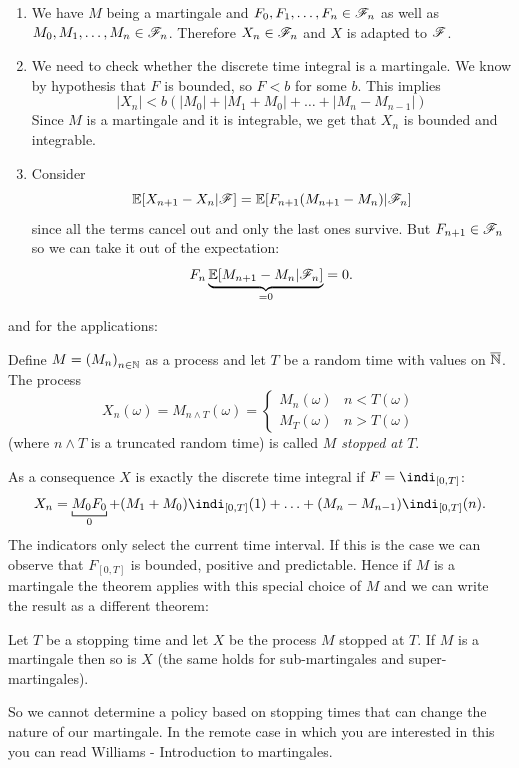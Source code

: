 \documentclass{report}
\begin{document}
\begin{fancyproof}
	\begin{enumerate}
		\item	We have $M$ being a martingale and $F_0,F_1,\ldots,F_n\in\mathscr{F}_{n}$ as well as $M_0,M_1,\ldots,M_{n}\in\mathscr{F}_n$. Therefore $X_{n}\in\mathscr{F}_{n}$ and $X$ is adapted to $\mathscr{F}$.
		\item We need to check whether the discrete time integral is a martingale. We know by hypothesis that $F$ is bounded, so $F<b$ for some $b$. This implies
		\begin{equation*}
			|X_{n}|<b(|M_{0}|+|M_1+M_0|+\ldots+|M_n-M_{n-1}|)
		\end{equation*}
		Since $M$ is a martingale and it is integrable, we get that $X_n$ is bounded and integrable.
		\item Consider
		\begin{equation*}
			\mathbb{E}[X_{n+1}-X_{n}|\mathscr{F}]=\mathbb{E}[F_{n+1}(M_{n+1}-M_{n})|\mathscr{F}_n]
		\end{equation*}
		since all the terms cancel out and only the last ones survive. But $F_{n+1}\in\mathscr{F}_{n}$ so we can take it out of the expectation:
		\[F_{n}\underbrace{\mathbb{E}[M_{n+1}-M_{n}|\mathscr{F}_{n}]}_{=0}=0.\]
	\end{enumerate}
\end{fancyproof}
and for the applications:\\
\begin{definition}
	Define $M={(M_{n})}_{n\in\mathbb{N}}$ as a process and let $T$ be a random time with values on $\overline{\mathbb{N}}$. The process
	\[X_{n}(\omega)=M_{n\wedge T}(\omega)=\begin{cases}
		M_{n}(\omega)&n<T(\omega)\\
		M_{T}(\omega)&n>T(\omega)
	\end{cases}\]
	(where $n\wedge T$ is a truncated random time) is called \emph{$M$ stopped at $T$}.
\end{definition}
As a consequence $X$ is exactly the discrete time integral if $F=\indi_{[0,T]}$:
\begin{equation*}
	X_{n}=\underbracket[0.6pt]{M_0F_0}_{0}+(M_{1}+M_{0})\indi_{[0,T]}(1)+\ldots+(M_{n}-M_{n-1})\indi_{[0,T]}(n).
\end{equation*}
The indicators only select the current time interval. If this is the case we can observe that $F_{[0,T]}$ is bounded, positive and predictable. Hence if $M$ is a martingale the theorem applies with this special choice of $M$ and we can write the result as a different theorem:
\begin{theorem}
	Let $T$ be a stopping time and let $X$ be the process $M$ stopped at $T$. If $M$ is a martingale then so is $X$ (the same holds for sub-martingales and super-martingales).
\end{theorem}
So we cannot determine a policy based on stopping times that can change the nature of our martingale. In the remote case in which you are interested in this you can read Williams - Introduction to martingales. \\
\end{document}

